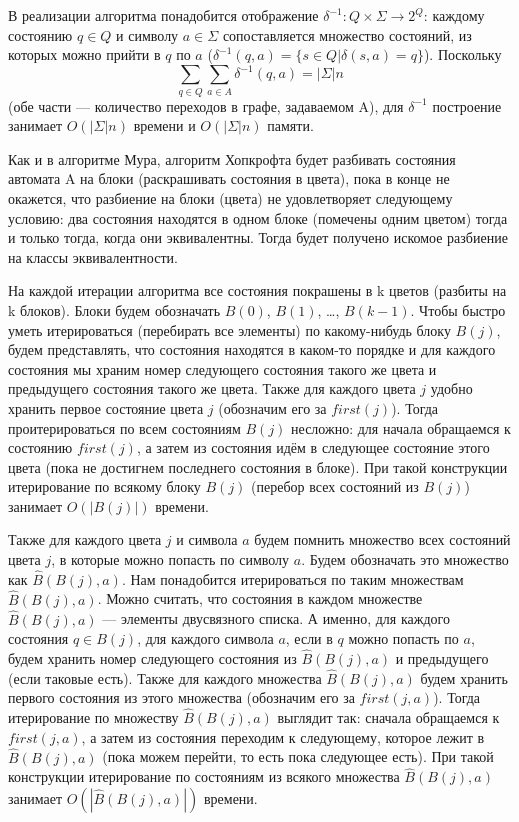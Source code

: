 \documentclass{article}
\begin{document}
В реализации алгоритма понадобится отображение $\delta^{-1}: Q \times \Sigma \longrightarrow 2^{Q}$: каждому состоянию $q \in Q$ и символу $a \in \Sigma$ сопоставляется множество состояний, из которых можно прийти в $q$ по $a$ ($\delta^{-1}(q, a) = \{s \in Q | \delta(s, a) = q\}$). Поскольку 
\[ \sum_{q \in Q} \sum_{a \in A} \delta^{-1}(q, a) = |\Sigma|n\] (обе части --- количество переходов в графе, задаваемом A), для $\delta^{-1}$ построение занимает $O(|\Sigma| n)$ времени и $O(|\Sigma| n)$ памяти.

Как и в алгоритме Мура, алгоритм Хопкрофта будет разбивать состояния автомата A на блоки (раскрашивать состояния в цвета), пока в конце не окажется, что разбиение на блоки (цвета) не удовлетворяет следующему условию: два состояния находятся в одном блоке (помечены одним цветом) тогда и только тогда, когда они эквивалентны. Тогда будет получено искомое разбиение на классы эквивалентности.

На каждой итерации алгоритма все состояния покрашены в k цветов (разбиты на k блоков). Блоки будем обозначать $B(0)$, $B(1)$, \dots, $B(k - 1)$. Чтобы быстро уметь итерироваться (перебирать все элементы) по какому-нибудь блоку $B(j)$, будем представлять, что состояния находятся в каком-то порядке и для каждого состояния мы храним номер следующего состояния такого же цвета и предыдущего состояния такого же цвета. Также для каждого цвета $j$ удобно хранить первое состояние цвета $j$ (обозначим его за $first(j)$). Тогда проитерироваться по всем состояниям $B(j)$ несложно: для начала обращаемся к состоянию $first(j)$, а затем из состояния идём в следующее состояние этого цвета (пока не достигнем последнего состояния в блоке). При такой конструкции итерирование по всякому блоку $B(j)$ (перебор всех состояний из $B(j)$) занимает $O(|B(j)|)$ времени.

Также для каждого цвета $j$ и символа $a$ будем помнить множество всех состояний цвета $j$, в которые можно попасть по символу $a$. Будем обозначать это множество как $\hat B(B(j), a)$. Нам понадобится итерироваться по таким множествам $\hat B(B(j), a)$. Можно считать, что состояния в каждом множестве $\hat B(B(j), a)$ --- элементы двусвязного списка. А именно, для каждого состояния $q \in B(j)$, для каждого символа $a$, если в $q$ можно попасть по $a$, будем хранить номер следующего состояния из $\hat B(B(j), a)$ и предыдущего (если таковые есть). Также для каждого множества $\hat B(B(j), a)$ будем хранить первого состояния из этого множества (обозначим его за $first(j, a)$). Тогда итерирование по множеству $\hat B(B(j), a)$ выглядит так: сначала обращаемся к $first(j, a)$, а затем из состояния переходим к следующему, которое лежит в $\hat B(B(j), a)$ (пока можем перейти, то есть пока следующее есть). При такой конструкции итерирование по состояниям из всякого множества $\hat B(B(j), a)$ занимает $O(|\hat B(B(j), a)|)$ времени.
\end{document}
